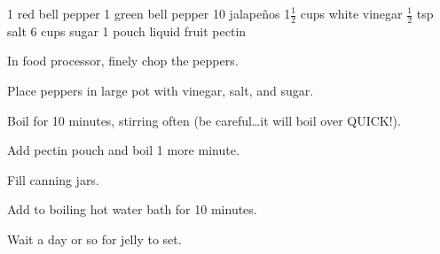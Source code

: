 \dishtype{\vegetarian, \sauce}
\begin{ingreds}
    1 red bell pepper
    1 green bell pepper
    10 jalape\~nos
    1$\frac{1}{2}$ cups white vinegar
    $\frac{1}{2}$ tsp salt
    6 cups sugar
    1 pouch liquid fruit pectin   
\end{ingreds}
\begin{method}
    In food processor, finely chop the peppers.\par
    Place peppers in large pot with vinegar, salt, and sugar.\par
    Boil for 10 minutes, stirring often (be careful…it will boil over QUICK!).\par
    Add pectin pouch and boil 1 more minute.\par
    Fill canning jars.\par
    Add to boiling hot water bath for 10 minutes.\par
    Wait a day or so for jelly to set.
\end{method}
